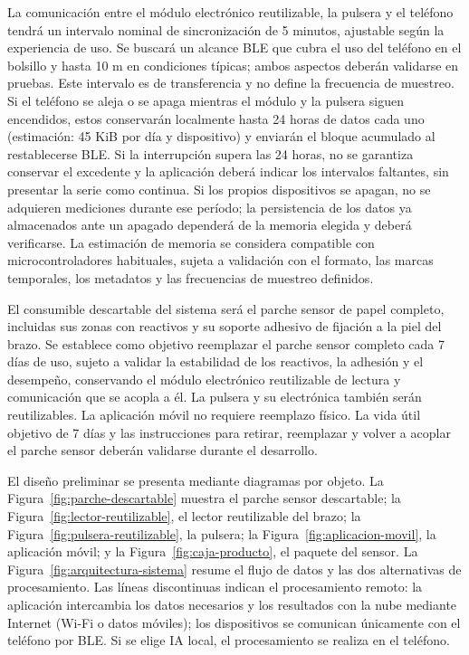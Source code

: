La comunicación entre el módulo electrónico reutilizable, la pulsera y el teléfono tendrá un intervalo nominal de sincronización de 5 minutos, ajustable según la experiencia de uso. Se buscará un alcance BLE que cubra el uso del teléfono en el bolsillo y hasta 10 m en condiciones típicas; ambos aspectos deberán validarse en pruebas. Este intervalo es de transferencia y no define la frecuencia de muestreo. Si el teléfono se aleja o se apaga mientras el módulo y la pulsera siguen encendidos, estos conservarán localmente hasta 24 horas de datos cada uno (estimación: 45 KiB por día y dispositivo) y enviarán el bloque acumulado al restablecerse BLE. Si la interrupción supera las 24 horas, no se garantiza conservar el excedente y la aplicación deberá indicar los intervalos faltantes, sin presentar la serie como continua. Si los propios dispositivos se apagan, no se adquieren mediciones durante ese período; la persistencia de los datos ya almacenados ante un apagado dependerá de la memoria elegida y deberá verificarse. La estimación de memoria se considera compatible con microcontroladores habituales, sujeta a validación con el formato, las marcas temporales, los metadatos y las frecuencias de muestreo definidos.

El consumible descartable del sistema será el parche sensor de papel completo, incluidas sus zonas con reactivos y su soporte adhesivo de fijación a la piel del brazo. Se establece como objetivo reemplazar el parche sensor completo cada 7 días de uso, sujeto a validar la estabilidad de los reactivos, la adhesión y el desempeño, conservando el módulo electrónico reutilizable de lectura y comunicación que se acopla a él. La pulsera y su electrónica también serán reutilizables. La aplicación móvil no requiere reemplazo físico. La vida útil objetivo de 7 días y las instrucciones para retirar, reemplazar y volver a acoplar el parche sensor deberán validarse durante el desarrollo.

El diseño preliminar se presenta mediante diagramas por objeto.
La Figura~\ref{fig:parche-descartable} muestra el parche sensor
 descartable; la Figura~\ref{fig:lector-reutilizable}, el lector
reutilizable del brazo; la Figura~\ref{fig:pulsera-reutilizable},
la pulsera; la Figura~\ref{fig:aplicacion-movil}, la aplicación
móvil; y la Figura~\ref{fig:caja-producto}, el paquete del sensor.
La Figura~\ref{fig:arquitectura-sistema} resume el flujo de datos y las dos alternativas de procesamiento. Las líneas discontinuas indican el procesamiento remoto: la aplicación intercambia los datos necesarios y los resultados con la nube mediante Internet (Wi-Fi o datos móviles); los dispositivos se comunican únicamente con el teléfono por BLE. Si se elige IA local, el procesamiento se realiza en el teléfono.



